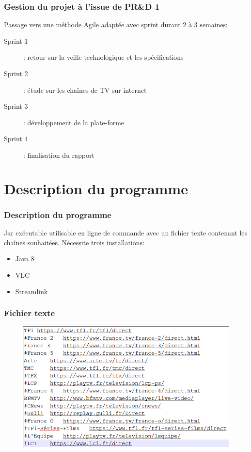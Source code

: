 \documentclass{beamer}
\begin{document}
\begin{frame}
\frametitle{Gestion du projet à l'issue de PR\&D 1}

Passage vers une méthode Agile adaptée avec sprint durant 2 à 3 semaines:

\begin{description}
	\item[Sprint 1]: retour sur la veille technologique et les spécifications
	\item[Sprint 2]: étude sur les chaînes de TV sur internet
	\item[Sprint 3]: développement de la plate-forme
	\item[Sprint 4]: finalisation du rapport
\end{description}


\end{frame}


\section{Description du programme}

\begin{frame}

\frametitle{Description du programme}

Jar exécutable utilisable en ligne de commande avec un fichier texte contenant les chaînes souhaitées.
\bigbreak
Nécessite trois installations:
\begin{itemize}
	\item Java 8
	\item VLC
	\item Streamlink
\end{itemize}

\end{frame}


\begin{frame}
\frametitle{Fichier texte}

\begin{figure}
	\includegraphics[scale=0.75]{images/textfile}
\end{figure}

\end{frame}
\end{document}
